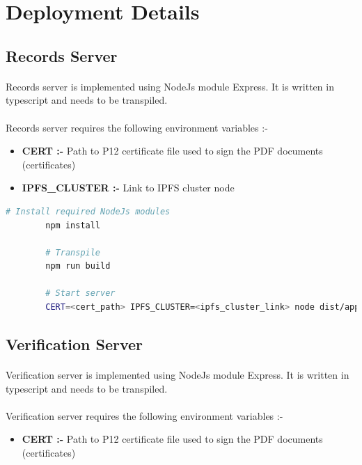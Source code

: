 \documentclass{article}
\begin{document}
        


\section{Deployment Details}
    \subsection{Records Server}
        \paragraph{}
        Records server is implemented using NodeJs module Express. It is written in typescript and needs to be transpiled.
        
        \paragraph{}
        Records server requires the following environment variables :-
        \begin{itemize}
            \item \textbf{CERT :-} Path to P12 certificate file used to sign the PDF documents (certificates)
            \item \textbf{IPFS\_CLUSTER :-} Link to IPFS cluster node
        \end{itemize}
        
        \begin{lstlisting}[language=bash, caption=Records Server]
        # Install required NodeJs modules
        npm install
    
        # Transpile
        npm run build
    
        # Start server
        CERT=<cert_path> IPFS_CLUSTER=<ipfs_cluster_link> node dist/app.js
        \end{lstlisting}
    
    \subsection{Verification Server}
        \paragraph{}
        Verification server is implemented using NodeJs module Express. It is written in typescript and needs to be transpiled.
        
        \paragraph{}
        Verification server requires the following environment variables :-
        \begin{itemize}
            \item \textbf{CERT :-} Path to P12 certificate file used to sign the PDF documents (certificates)
        \end{itemize}
    
\end{document}
